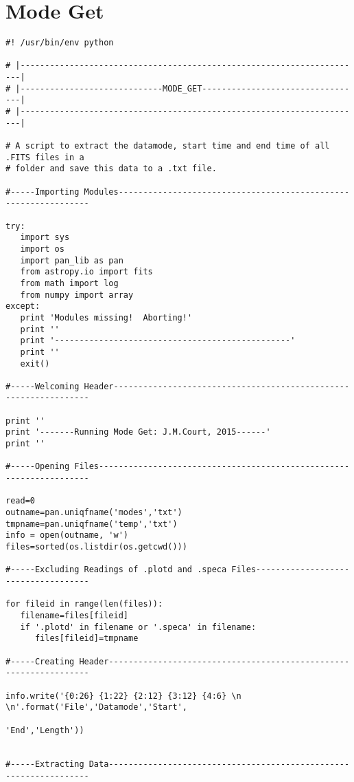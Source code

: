\section{Mode Get}

\begin{verbatim}
#! /usr/bin/env python

# |----------------------------------------------------------------------|
# |-----------------------------MODE_GET---------------------------------|
# |----------------------------------------------------------------------|

# A script to extract the datamode, start time and end time of all .FITS files in a
# folder and save this data to a .txt file.

#-----Importing Modules----------------------------------------------------------------

try:
   import sys
   import os
   import pan_lib as pan
   from astropy.io import fits
   from math import log
   from numpy import array
except:
   print 'Modules missing!  Aborting!'
   print ''
   print '------------------------------------------------'
   print ''
   exit()

#-----Welcoming Header-----------------------------------------------------------------

print ''
print '-------Running Mode Get: J.M.Court, 2015------'
print ''

#-----Opening Files--------------------------------------------------------------------

read=0
outname=pan.uniqfname('modes','txt')
tmpname=pan.uniqfname('temp','txt')
info = open(outname, 'w')
files=sorted(os.listdir(os.getcwd()))

#-----Excluding Readings of .plotd and .speca Files------------------------------------

for fileid in range(len(files)):
   filename=files[fileid]
   if '.plotd' in filename or '.speca' in filename:
      files[fileid]=tmpname

#-----Creating Header------------------------------------------------------------------

info.write('{0:26} {1:22} {2:12} {3:12} {4:6} \n \n'.format('File','Datamode','Start',
                                                            'End','Length'))


#-----Extracting Data------------------------------------------------------------------


\end{verbatim}
